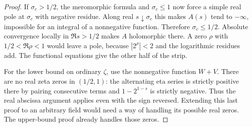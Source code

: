 \begin{proof}
If $\sigma_c>1/2$, the meromorphic formula and $\sigma_c\le1$ now force a simple real pole at $\sigma_c$ with negative residue. Along real $s\downarrow\sigma_c$ this makes $A(s)$ tend to $-\infty$, impossible for an integral of a nonnegative function. Therefore $\sigma_c\le1/2$. Absolute convergence locally in $\Re s>1/2$ makes $A$ holomorphic there. A zero $\rho$ with $1/2<\Re\rho<1$ would leave a pole, because $|2^\rho|<2$ and the logarithmic residues add. The functional equations give the other half of the strip.

For the lower bound on ordinary $\zeta$, use the nonnegative function $W+V$. There are no real zeta zeros in $(1/2,1)$: the alternating eta series is strictly positive there by pairing consecutive terms and $1-2^{1-s}$ is strictly negative. Thus the real abscissa argument applies even with the sign reversed. Extending this last proof to an arbitrary field would need a way of handling its possible real zeros. The upper-bound proof already handles those zeros.
\end{proof}

